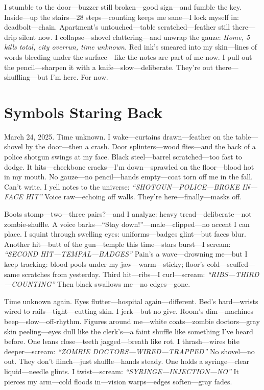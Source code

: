 \documentclass{article}
\begin{document}
I stumble to the door—buzzer still broken—good sign—and fumble the key. Inside—up the stairs—28 steps—counting keeps me sane—I lock myself in: deadbolt—chain. Apartment’s untouched—table scratched—feather still there—drip silent now. I collapse—shovel clattering—and unwrap the gauze: \textit{Home, 5 kills total, city overrun, time unknown.} Red ink’s smeared into my skin—lines of words bleeding under the surface—like the notes are part of me now. I pull out the pencil—sharpen it with a knife—slow—deliberate. They’re out there—shuffling—but I’m here. For now.

\section*{Symbols Staring Back}

March 24, 2025. Time unknown. I wake—curtains drawn—feather on the table—shovel by the door—then a crash. Door splinters—wood flies—and the back of a police shotgun swings at my face. Black steel—barrel scratched—too fast to dodge. It hits—cheekbone cracks—I’m down—sprawled on the floor—blood hot in my mouth. No gauze—no pencil—hands empty—coat torn off me in the fall. Can’t write. I yell notes to the universe: \textit{“SHOTGUN—POLICE—BROKE IN—FACE HIT”} Voice raw—echoing off walls. They’re here—finally—masks off.

Boots stomp—two—three pairs?—and I analyze: heavy tread—deliberate—not zombie-shuffle. A voice barks—“Stay down!”—male—clipped—no accent I can place. I squint through swelling eyes: uniforms—badges glint—but faces blur. Another hit—butt of the gun—temple this time—stars burst—I scream: \textit{“SECOND HIT—TEMPAL—BADGES”} Pain’s a wave—drowning me—but I keep tracking: blood pools under my jaw—warm—sticky; floor’s cold—scuffed—same scratches from yesterday. Third hit—ribs—I curl—scream: \textit{“RIBS—THIRD—COUNTING”} Then black swallows me—no edges—gone.

Time unknown again. Eyes flutter—hospital again—different. Bed’s hard—wrists wired to rails—tight—cutting skin. I jerk—but no give. Room’s dim—machines beep—slow—off-rhythm. Figures around me—white coats—zombie doctors—gray skin peeling—eyes dull like the clerk’s—a faint shuffle like something I’ve heard before. One leans close—teeth jagged—breath like rot. I thrash—wires bite deeper—scream: \textit{“ZOMBIE DOCTORS—WIRED—TRAPPED”} No shovel—no out. They don’t flinch—just shuffle—hands steady. One holds a syringe—clear liquid—needle glints. I twist—scream: \textit{“SYRINGE—INJECTION—NO”} It pierces my arm—cold floods in—vision warps—edges soften—gray fades.
\end{document}
